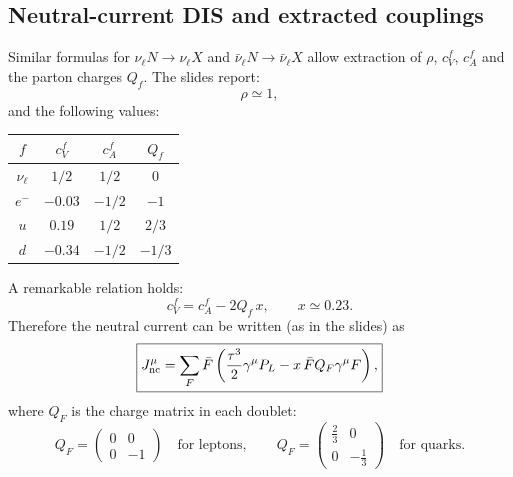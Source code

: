 \subsection{Neutral-current DIS and extracted couplings}
Similar formulas for
$\nu_\ell N\to \nu_\ell X$ and $\bar\nu_\ell N\to \bar\nu_\ell X$
allow extraction of $\rho$, $c_V^f$, $c_A^f$ and the parton charges $Q_f$.
The slides report:
\begin{equation}
\rho\simeq 1,
\end{equation}
and the following values:
\begin{center}
\begin{tabular}{@{}cccc@{}}
\toprule
$f$ & $c_V^f$ & $c_A^f$ & $Q_f$\\
\midrule
$\nu_\ell$ & $1/2$ & $1/2$ & $0$\\
$e^-$ & $-0.03$ & $-1/2$ & $-1$\\
$u$ & $0.19$ & $1/2$ & $2/3$\\
$d$ & $-0.34$ & $-1/2$ & $-1/3$\\
\bottomrule
\end{tabular}
\end{center}
A remarkable relation holds:
\begin{equation}
\boxed{
c_V^f = c_A^f - 2Q_f\,x,
\qquad x\simeq 0.23.
}
\end{equation}
Therefore the neutral current can be written (as in the slides) as
\begin{equation}
\boxed{
J^\mu_{\rm nc}
=
\sum_F
\bar F\left(\frac{\tau^3}{2}\gamma^\mu P_L - x\,\bar F Q_F\gamma^\mu F\right),
}
\end{equation}
where $Q_F$ is the charge matrix in each doublet:
\begin{equation}
Q_F=
\begin{pmatrix}
0&0\\
0&-1
\end{pmatrix}
\quad\text{for leptons},
\qquad
Q_F=
\begin{pmatrix}
\frac{2}{3}&0\\
0&-\frac{1}{3}
\end{pmatrix}
\quad\text{for quarks}.
\end{equation}


